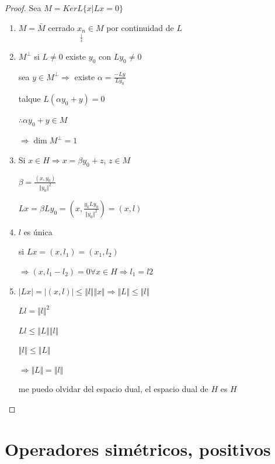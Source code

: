 \documentclass[a4paper,10pt]{book}
\begin{document}
\begin{proof}
    Sea $M= Ker L \{ x | Lx =0 \}$

    \begin{enumerate}
        \item $M= \bar{M} $  cerrado  $\underset{\underset{x}{\downarrow}}{x_n}\in M$ por continuidad de $L$

        \item $M^\perp $ si $L\neq 0 $ existe $y_0$ con $L y_0 \neq 0$ 
        
        sea $y \in M^\perp \Rightarrow $  existe $\alpha = \frac{-Ly}{L y_0}$

        talque $L(\alpha y_0 +y ) = 0$ 

        $ \therefore  \alpha y_0 +y \in M $

        $\Rightarrow \dim M^\perp = 1$

        \item Si $x\in H \Rightarrow x= \beta y_0 + z $, $z\in M$

        $\beta = \frac{(x,y_0)}{\Vert y_0 \Vert^2}$

        $Lx = \beta L y_0 =( x,\frac{y_0 L y_0 }{\Vert y_0 \Vert^2}) = (x,l)$

        \item $l$ es única 

        si $Lx = ( x,l_1) = (x_1,l_2) $

        $\Rightarrow (x,l_1-l_2) =0  \forall x\in H \Rightarrow l_1=l2$

        \item $|Lx| =| (x,l) |\leq \Vert l\Vert \Vert x\Vert \Rightarrow \Vert L\Vert \leq \Vert l \Vert$

        $L l = \Vert l\Vert^2$
        
        $L l \leq \Vert L\Vert \Vert l \Vert$

        $ \Vert l\Vert \leq \Vert L \Vert$

        $\Rightarrow \Vert L \Vert = \Vert l \Vert$

        me puedo olvidar del espacio dual, el espacio dual de $H$ es $H$
        

        
    \end{enumerate}
\end{proof}

\section{Operadores simétricos, positivos}
\end{document}
